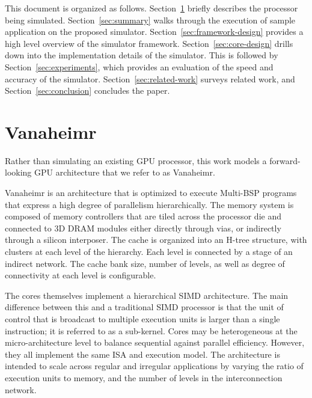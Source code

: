 \documentclass[conference, 10pt]{IEEEtran}
\begin{document}
This document is organized as follows.  
Section~\ref{sec:vanaheimr} briefly describes the processor being simulated.
Section~\ref{sec:summary} walks through the execution of sample application on
the proposed simulator.
Section~\ref{sec:framework-design} provides a high level overview of the 
simulator framework. 
Section~\ref{sec:core-design} drills down into the implementation details of 
the simulator.  
This is followed by Section~\ref{sec:experiments}, which provides an evaluation
of the speed and accuracy of the simulator.
Section~\ref{sec:related-work} surveys related work, and
Section~\ref{sec:conclusion} concludes the paper.


\section{Vanaheimr}
\label{sec:vanaheimr}

Rather than simulating an existing GPU processor, this work models a forward-looking
GPU architecture that we refer to as Vanaheimr.

Vanaheimr is an architecture that is optimized to execute Multi-BSP programs
that express a high degree of parallelism hierarchically.  The memory system
is composed of memory controllers that are tiled across the processor die
and connected to 3D DRAM modules either directly through vias, or
indirectly through a silicon interposer.  The cache is organized
into an H-tree structure, with clusters at each level of the hierarchy.  Each
level is connected by a stage of an indirect network.  The cache bank size,
number of levels, as well as degree of connectivity at each level is
configurable.  

The cores themselves implement a hierarchical SIMD architecture.
The main difference between this and a traditional SIMD processor is that the
unit of control that is broadcast to multiple execution units is larger than
a single instruction; it is referred to as a sub-kernel.  Cores may be
heterogeneous at the micro-architecture level to balance sequential against
parallel efficiency.  However, they all implement the same ISA and execution 
model. The architecture is intended to scale across regular and irregular 
applications by varying the ratio of execution units to memory, and the number 
of levels in the interconnection network.  
\end{document}
